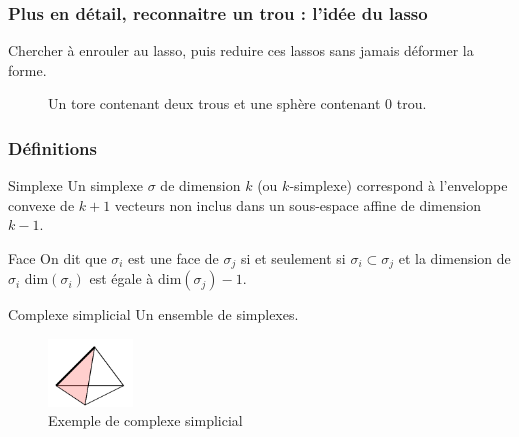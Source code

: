 \documentclass{beamer}
\begin{document}
\begin{frame}
    \frametitle{Plus en détail, reconnaitre un trou : l'idée du lasso}
    Chercher à enrouler au lasso, puis reduire ces lassos sans jamais déformer la forme.  
    \begin{figure}
        \centering
        \caption{Un tore contenant deux trous et une sphère contenant 0 trou.}
    \end{figure}
\end{frame}

\begin{frame}
    \frametitle{Définitions}
    \begin{block}{Simplexe}
        Un simplexe $\sigma$ de dimension $k$ (ou $k$-simplexe) correspond à l'enveloppe convexe de $k+1$ vecteurs non inclus dans un sous-espace affine de dimension $k-1$.
    \end{block}

    \begin{block}{Face}
        On dit que $\sigma_i$ est une face de $\sigma_j$ si et seulement si $\sigma_i \subset \sigma_j$ et la dimension de $\sigma_i$ dim$(\sigma_i)$ est égale à dim$(\sigma_j) - 1$.
    \end{block}

    \begin{block}{Complexe simplicial}
        Un ensemble de simplexes.
    \end{block}

    \begin{figure}
        \includegraphics[width=0.2\textwidth]{../images/SimpFaceCompl.png}
        \centering
        \caption{Exemple de complexe simplicial}
    \end{figure}
    
\end{frame}
\end{document}
